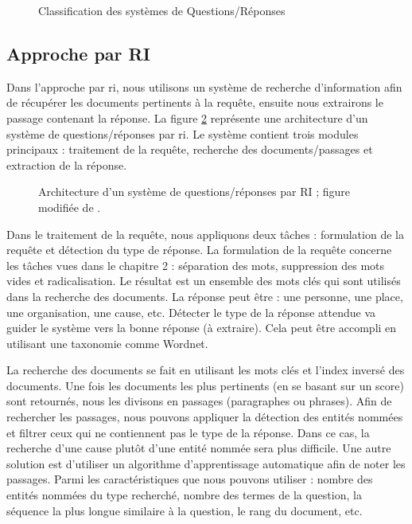 \documentclass{KodeBook}
\begin{document}
\begin{figure}[!ht]
	\centering
	\caption{Classification des systèmes de Questions/Réponses}
	\label{fig:qr-classif}
\end{figure}

\subsection{Approche par RI}

Dans l'approche par \ac{ri}, nous utilisons un système de recherche d'information afin de récupérer les documents pertinents à la requête, ensuite nous extrairons le passage contenant la réponse.
La figure \ref{fig:qa-ri} représente une architecture d'un système de questions/réponses par \ac{ri}. 
Le système contient trois modules principaux : traitement de la requête, recherche des documents/passages et extraction de la réponse. 

\begin{figure}[ht]
	\centering
	\caption[Architecture d'un système de questions/réponses par RI.]{Architecture d'un système de questions/réponses par RI ; figure modifiée de \cite{2019-jurafsky-martin}.}
	\label{fig:qa-ri}
\end{figure}

Dans le traitement de la requête, nous appliquons deux tâches : formulation de la requête et détection du type de réponse. 
La formulation de la requête concerne les tâches vues dans le chapitre 2 : séparation des mots, suppression des mots vides et radicalisation. 
Le résultat est un ensemble des mots clés qui sont utilisés dans la recherche des documents. 
La réponse peut être : une personne, une place, une organisation, une cause, etc. 
Détecter le type de la réponse attendue va guider le système vers la bonne réponse (à extraire). 
Cela peut être accompli en utilisant une taxonomie comme Wordnet.

La recherche des documents se fait en utilisant les mots clés et l'index inversé des documents. 
Une fois les documents les plus pertinents (en se basant sur un score) sont retournés, nous les divisons en passages (paragraphes ou phrases). 
Afin de rechercher les passages, nous pouvons appliquer la détection des entités nommées et filtrer ceux qui ne contiennent pas le type de la réponse.
Dans ce cas, la recherche d'une cause plutôt d'une entité nommée sera plus difficile. 
Une autre solution est d'utiliser un algorithme d'apprentissage automatique afin de noter les passages. 
Parmi les caractéristiques que nous pouvons utiliser : nombre des entités nommées du type recherché, nombre des termes de la question, la séquence la plus longue similaire à la question, le rang du document, etc.
\end{document}

